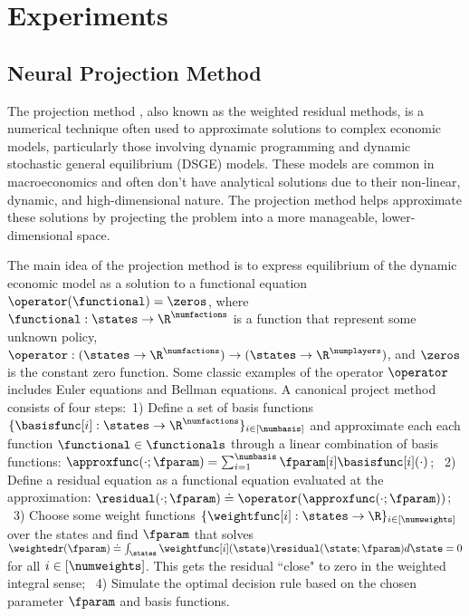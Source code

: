 \section{Experiments}\label{sec_app:experiments}

\subsection{Neural Projection Method}
\label{sec_app:npm}

The projection method \cite{judd_projection_1992}, also known as the weighted residual methods, is a numerical technique often used to approximate solutions to complex economic models, particularly those involving dynamic programming and dynamic stochastic general equilibrium (DSGE) models. 
These models are common in macroeconomics and often don't have analytical solutions due to their non-linear, dynamic, and high-dimensional nature. The projection method helps approximate these solutions by projecting the problem into a more manageable, lower-dimensional space.

The main idea of the projection method is to express equilibrium of the dynamic economic model as a solution to a functional equation $\operator(\functional)=\zeros$, where 
$\functional: \states \to \R^\numfactions$ is a function that represent some unknown policy, 
$\operator: (\states\to \R^\numfactions) \to (\states \to \R^\numplayers)$, 
and
$\zeros$ is the constant zero function. Some classic examples of the operator $\operator$ includes Euler equations and Bellman equations.
A canonical project method consists of four steps:~1) Define a set of basis functions $\{\basisfunc[i]: \states \to \R^\numfactions\}_{i\in [\numbasis]}$ and approximate each each function $\functional\in \functionals$
through a linear combination of basis functions: $\approxfunc(\cdot;\fparam)=\sum_{i=1}^\numbasis \fparam[i]\basisfunc[i](\cdot)$;
~2) Define a residual equation as a functional equation evaluated at the approximation: $\residual(\cdot;\fparam)\doteq \operator(\approxfunc(\cdot; \fparam))$;
~3) Choose some weight functions $\{\weightfunc[i]: \states \to \R\}_{i\in [\numweights]}$ over the states and
find $\fparam$ that solves $\weightedr(\fparam)\doteq\int_{\states} \weightfunc[i](\state)\residual(\state; \fparam) d\state=0$ for all $i\in [\numweights]$. This gets the residual ``close" to zero in the weighted integral sense;
~4) Simulate the optimal decision rule based on the chosen parameter $\fparam$ and basis functions.


